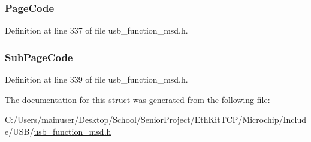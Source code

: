 \subsubsection[{Page\+Code}]{ Page\+Code}\label{struct_mode_sense_c_b_a53ee9769775f645af63931eb0fef7922}


Definition at line 337 of file usb\+\_\+function\+\_\+msd.\+h.

\hypertarget{struct_mode_sense_c_b_a1d8ac6eaafe18f9d665d97448add7bdc}{}
\subsubsection[{Sub\+Page\+Code}]{ Sub\+Page\+Code}\label{struct_mode_sense_c_b_a1d8ac6eaafe18f9d665d97448add7bdc}


Definition at line 339 of file usb\+\_\+function\+\_\+msd.\+h.



The documentation for this struct was generated from the following file\+:\begin{DoxyCompactItemize}
\item 
C\+:/\+Users/mainuser/\+Desktop/\+School/\+Senior\+Project/\+Eth\+Kit\+T\+C\+P/\+Microchip/\+Include/\+U\+S\+B/\hyperlink{usb__function__msd_8h}{usb\+\_\+function\+\_\+msd.\+h}\end{DoxyCompactItemize}
